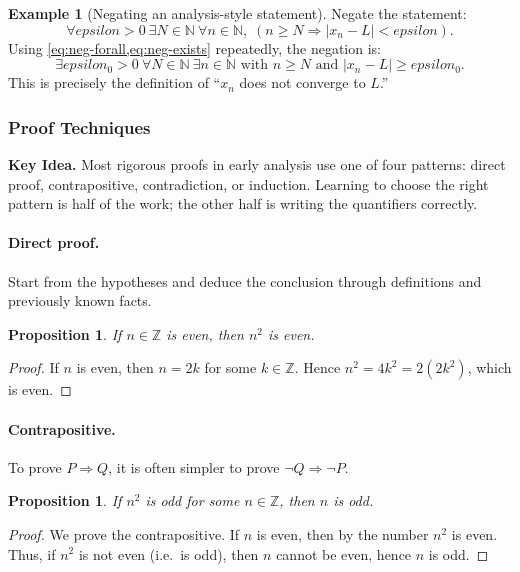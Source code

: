 \documentclass[12pt]{article}
\numberwithin{equation}{section}
\def\abs#1{|#1|}
\def\eps{epsilon}
\newcommand{\ZZ}{\mathbb{Z}}
\newcommand{\NN}{\mathbb{N}}
\DeclarePairedDelimiter{\abs}{\lvert}{\rvert}
\newcommand{\eps}{\varepsilon}               %
\theoremstyle{plain}
\newtheorem{proposition}[theorem]{Proposition}
\theoremstyle{definition}
\newtheorem{example}[theorem]{Example}
\theoremstyle{remark}
\newenvironment{keyidea}{\begin{tcolorbox}\textbf{Key Idea.}}{\end{tcolorbox}}
\begin{document}
\begin{example}[Negating an analysis-style statement]
Negate the statement:
\[
\forall \eps>0\ \exists N\in\NN\ \forall n\in\NN,\; (n\ge N \Rightarrow \abs{x_n - L} < \eps).
\]
Using \cref{eq:neg-forall,eq:neg-exists} repeatedly, the negation is:
\[
\exists \eps_0>0\ \forall N\in\NN\ \exists n\in\NN \text{ with } n\ge N \text{ and } \abs{x_n - L} \ge \eps_0.
\]
This is precisely the definition of ``$x_n$ does not converge to $L$.''
\end{example}

\subsubsection{Proof Techniques}

\begin{keyidea}
Most rigorous proofs in early analysis use one of four patterns:
direct proof, contrapositive, contradiction, or induction.
Learning to choose the right pattern is half of the work; the other half is writing the quantifiers correctly.
\end{keyidea}

\paragraph{Direct proof.}
Start from the hypotheses and deduce the conclusion through definitions and previously known facts.

\begin{proposition}\label{prop:even-square}
If $n\in\ZZ$ is even, then $n^2$ is even.
\end{proposition}
\begin{proof}
If $n$ is even, then $n=2k$ for some $k\in\ZZ$. Hence $n^2 = 4k^2 = 2(2k^2)$, which is even.
\end{proof}

\paragraph{Contrapositive.}
To prove $P\Rightarrow Q$, it is often simpler to prove $\neg Q\Rightarrow \neg P$.

\begin{proposition}\label{prop:odd-square}
If $n^2$ is odd for some $n\in\ZZ$, then $n$ is odd.
\end{proposition}
\begin{proof}
We prove the contrapositive. If $n$ is even, then by  the number $n^2$ is even.  
Thus, if $n^2$ is not even (i.e.\ is odd), then $n$ cannot be even, hence $n$ is odd.
\end{proof}
\end{document}
